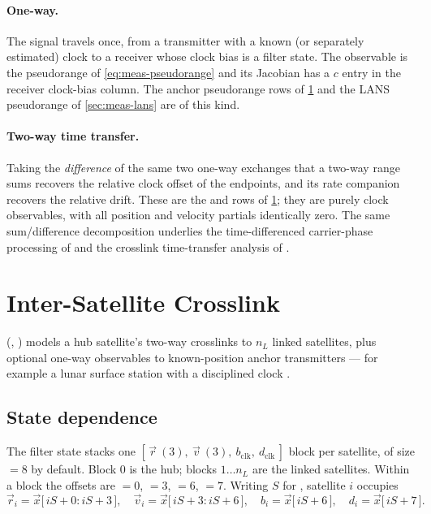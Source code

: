 \paragraph{One-way.} The signal travels once, from a transmitter with a known
(or separately estimated) clock to a receiver whose clock bias is a filter
state. The observable is the pseudorange of \cref{eq:meas-pseudorange} and its
Jacobian has a $c$ entry in the receiver clock-bias column. The anchor
pseudorange rows of \cref{sec:meas-crosslink} and the LANS pseudorange of
\cref{sec:meas-lans} are of this kind.

\paragraph{Two-way time transfer.} Taking the \emph{difference} of the same two
one-way exchanges that a two-way range sums recovers the relative clock offset
of the endpoints, and its rate companion recovers the relative drift. These are
the  and  rows
of \cref{sec:meas-crosslink}; they are purely clock observables, with all
position and velocity partials identically zero. The same
sum/difference decomposition underlies the time-differenced carrier-phase
processing of \citet{iiyama2023tdcp} and the crosslink time-transfer analysis
of \citep[Ch.~6]{iiyama2026thesis}.

\section{Inter-Satellite Crosslink}
\label{sec:meas-crosslink}

(,
) models a hub
satellite's two-way crosslinks to $n_L$ linked satellites, plus optional
one-way observables to known-position anchor transmitters --- for example a
lunar surface station with a disciplined clock \citep{casadesus2025surface}.

\subsection{State dependence}

The filter state stacks one
$[\,\vec{r}\ (3),\ \vec{v}\ (3),\ b_\mathrm{clk},\ d_\mathrm{clk}\,]$ block per
satellite, of size  $= 8$ by default. Block $0$
is the hub; blocks $1 \dots n_L$ are the linked satellites. Within a block the
offsets are  $=0$,  $=3$,
 $=6$,  $=7$. Writing $S$ for
, satellite $i$ occupies
\begin{equation}
  \vec{r}_i = \vec{x}\big[\,iS + 0 : iS + 3\,\big], \quad
  \vec{v}_i = \vec{x}\big[\,iS + 3 : iS + 6\,\big], \quad
  b_i = \vec{x}\big[\,iS + 6\,\big], \quad
  d_i = \vec{x}\big[\,iS + 7\,\big].
  \label{eq:meas-xl-layout}
\end{equation}

